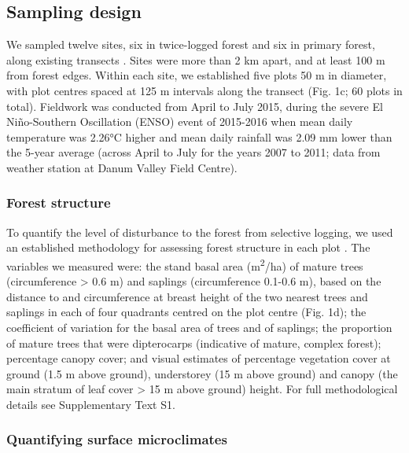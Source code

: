 \documentclass[12pt,a4paper,]{report}
\theoremstyle{definition}
\theoremstyle{definition}
\theoremstyle{definition}
\theoremstyle{remark}
\begin{document}
\subsection{Sampling design}\label{sampling-design}

We sampled twelve sites, six in twice-logged forest and six in primary
forest, along existing transects \citep[Fig.
1b;][]{edwards_degraded2011, edwards_selective-logging2014}. Sites were
more than 2 km apart, and at least 100 m from forest edges. Within each
site, we established five plots 50 m in diameter, with plot centres
spaced at 125 m intervals along the transect (Fig. 1c; 60 plots in
total). Fieldwork was conducted from April to July 2015, during the
severe El Niño-Southern Oscillation (ENSO) event of 2015-2016
\citep{noaa2015} when mean daily temperature was 2.26°C higher and mean
daily rainfall was 2.09 mm lower than the 5-year average (across April
to July for the years 2007 to 2011; data from weather station at Danum
Valley Field Centre).

\subsubsection*{Forest structure}\label{forest-structure}

To quantify the level of disturbance to the forest from selective
logging, we used an established methodology for assessing forest
structure in each plot \citep{hamer_ecology2003, lucey_spillover2012}.
The variables we measured were: the stand basal area
(m\textsuperscript{2}/ha) of mature trees (circumference \textgreater{}
0.6 m) and saplings (circumference 0.1-0.6 m), based on the distance to
and circumference at breast height of the two nearest trees and saplings
in each of four quadrants centred on the plot centre (Fig. 1d); the
coefficient of variation for the basal area of trees and of saplings;
the proportion of mature trees that were dipterocarps (indicative of
mature, complex forest); percentage canopy cover; and visual estimates
of percentage vegetation cover at ground (1.5 m above ground),
understorey (15 m above ground) and canopy (the main stratum of leaf
cover \textgreater{} 15 m above ground) height. For full methodological
details see Supplementary Text S1.

\subsubsection*{Quantifying surface
microclimates}\label{quantifying-surface-microclimates}
\end{document}
